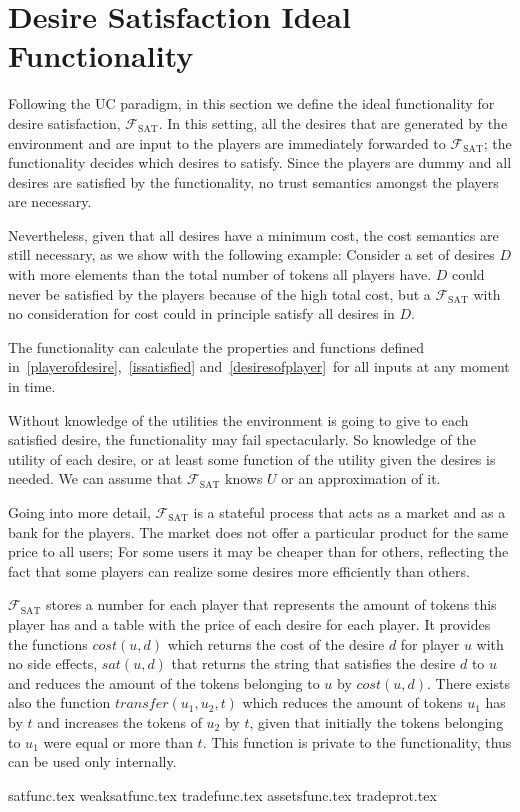\section{Desire Satisfaction Ideal Functionality}
  Following the UC paradigm, in this section we define the ideal functionality for desire
  satisfaction, $\mathcal{F}_{\mathrm{SAT}}$. In this setting, all the desires that are
  generated by the environment and are input to the players are immediately forwarded to
  $\mathcal{F}_{\mathrm{SAT}}$; the functionality decides which desires to satisfy. Since
  the players are dummy and all desires are satisfied by the functionality, no trust
  semantics amongst the players are necessary.

  Nevertheless, given that all desires have a minimum cost, the cost semantics are still
  necessary, as we show with the following example: Consider a set of desires $D$ with
  more elements than the total number of tokens all players have. $D$ could never be
  satisfied by the players because of the high total cost, but a
  $\mathcal{F}_{\mathrm{SAT}}$ with no consideration for cost could in principle satisfy
  all desires in $D$.

  The functionality can calculate the properties and functions defined
  in~\ref{playerofdesire},~\ref{issatisfied} and~\ref{desiresofplayer}\ for all inputs at
  any moment in time.

  Without knowledge of the utilities the environment is going to give to each satisfied
  desire, the functionality may fail spectacularly. So knowledge of the utility of each
  desire, or at least some function of the utility given the desires is needed. We can
  assume that $\mathcal{F}_{\mathrm{SAT}}$ knows $U$ or an approximation of it.

  Going into more detail, $\mathcal{F}_{\mathrm{SAT}}$ is a stateful process that acts as
  a market and as a bank for the players. The market does not offer a particular product
  for the same price to all users; For some users it may be cheaper than for others,
  reflecting the fact that some players can realize some desires more efficiently than
  others.

  $\mathcal{F}_{\mathrm{SAT}}$ stores a number for each player that represents the amount
  of tokens this player has and a table with the price of each desire for each player. It
  provides the functions $cost\left(u, d\right)$ which returns the cost of the desire $d$
  for player $u$ with no side effects, $sat\left(u, d\right)$ that returns the string that
  satisfies the desire $d$ to $u$ and reduces the amount of the tokens belonging to $u$ by
  $cost\left(u, d\right)$. There exists also the function $transfer\left(u_1, u_2,
  t\right)$ which reduces the amount of tokens $u_1$ has by $t$ and increases the tokens
  of $u_2$ by $t$, given that initially the tokens belonging to $u_1$ were equal or more
  than $t$. This function is private to the functionality, thus can be used only
  internally.

  {satfunc.tex}
  {weaksatfunc.tex}
  {tradefunc.tex}
  {assetsfunc.tex}
  {tradeprot.tex}
